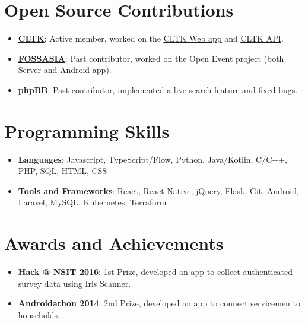 \documentclass[letterpaper,11pt]{article}
\newcommand{\resumeItem}[2]{
  \item\small{
    \textbf{#1}{: #2 \vspace{-2pt}}
  }
}
\newcommand{\resumeSubItem}[2]{\resumeItem{#1}{#2}\vspace{-4pt}}
\newcommand{\resumeSubHeadingListStart}{\begin{itemize}[leftmargin=*]}
\newcommand{\resumeSubHeadingListEnd}{\end{itemize}}
\begin{document}
\section{Open Source Contributions}
  \resumeSubHeadingListStart
    \resumeSubItem{\href{https://github.com/cltk}{\underline{CLTK}}}
      {Active member, worked on the \href{https://github.com/cltk/cltk_frontend/commits?author=suheb}{\underline{CLTK Web app}} and \href{https://github.com/cltk/cltk_api/commits?author=suheb}{\underline{CLTK API}}.}
    \resumeSubItem{\href{https://github.com/fossasia}{\underline{FOSSASIA}}}
      {Past contributor, worked on the Open Event project (both \href{https://github.com/fossasia/open-event-server/pulls?q=is\%3Apr+author\%3Asuheb+is\%3Aclosed}{\underline{Server}} and \href{https://github.com/fossasia/open-event-droidgen/pulls?q=is\%3Apr+is\%3Aclosed+author\%3Asuheb}{\underline{Android app}}).}
    \resumeSubItem{\href{https://github.com/phpbb}{\underline{phpBB}}}
      {Past contributor, implemented a live search \href{https://github.com/phpbb/phpbb/pulls?q=is\%3Apr+author\%3Asuheb+is\%3Aclosed}{\underline{feature and fixed bugs}}.}
  \resumeSubHeadingListEnd
  
\section{Programming Skills}
 \resumeSubHeadingListStart
    \resumeSubItem{Languages}
       {Javascript, TypeScript/Flow, Python, Java/Kotlin, C/C++, PHP, SQL, HTML, CSS}
    \resumeSubItem{Tools and Frameworks}
       {React, React Native, jQuery, Flask, Git, Android, Laravel, MySQL, Kubernetes, Terraform}
 \resumeSubHeadingListEnd

\section{Awards and Achievements}
  \resumeSubHeadingListStart
    \resumeSubItem{Hack @ NSIT 2016}
       {1st Prize, developed an app to collect authenticated survey data using Iris Scanner.}
    \resumeSubItem{Androidathon 2014}
       {2nd Prize, developed an app to connect servicemen to households.}
  \resumeSubHeadingListEnd


\end{document}

